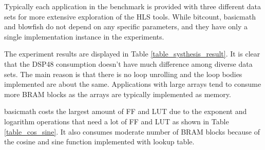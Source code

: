 \documentclass[conference]{IEEEtran}
\begin{document}
Typically each application in the benchmark is provided with three different data sets for more extensive exploration of the HLS tools. While bitcount, basicmath and blowfish do not depend on any specific parameters, and they have only a single implementation instance in the experiments. 

The experiment results are displayed in Table \ref{table_systhesis_result}. It is clear that the DSP48 consumption doesn't have much difference among diverse data sets. The main reason is that there is no loop unrolling and the loop bodies implemented are about the same. Applications with large arrays tend to consume more BRAM blocks as the arrays are typically implemented as memory. 


basicmath costs the largest amount of FF and LUT due to the exponent and logarithm operations that need a lot of FF and LUT as shown in Table \ref{table_cos_sine}. It also consumes moderate number of BRAM blocks because of the cosine and sine function implemented with lookup table. 

\end{document}
